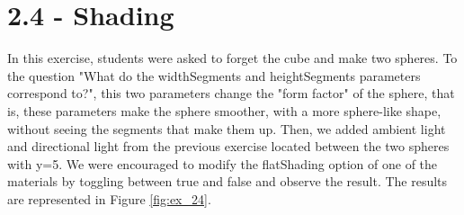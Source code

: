 \documentclass[12pt]{article}
\begin{document}
\section*{2.4 - Shading}
\label{ex_24}

In this exercise, students were asked to forget the cube and make two spheres.\newline
To the question "What do the widthSegments and heightSegments parameters correspond to?", this two parameters change the "form factor" of the sphere, that is, these parameters make the sphere smoother, with a more sphere-like shape, without seeing the segments that make them up.\newline
Then, we added ambient light and directional light from the previous exercise located between the two spheres with y=5.\newline
We were encouraged to modify the flatShading option of one of the materials by toggling between true and false and observe the result. The results are represented in Figure \ref{fig:ex_24}.
\end{document}

